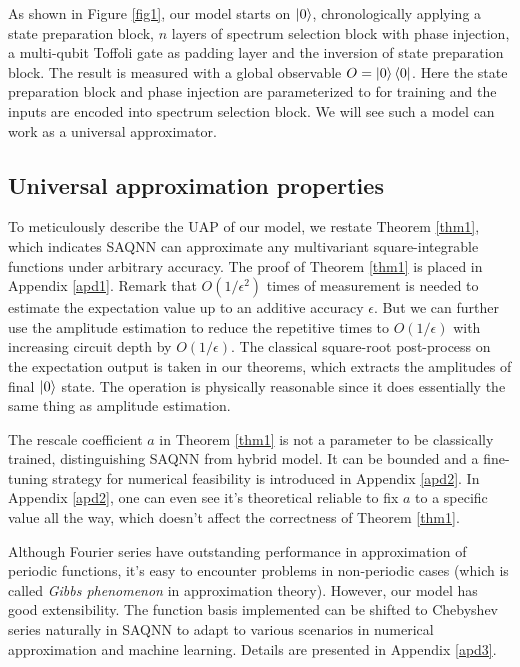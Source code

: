 \documentclass{article}
\theoremstyle{plain}
\theoremstyle{definition}
\theoremstyle{remark}
\begin{document}
As shown in Figure \ref{fig1}, our model starts on $\ket{0}$, chronologically applying a state preparation block, $n$ layers of spectrum selection block with phase injection, a multi-qubit Toffoli gate as padding layer and the inversion of state preparation block. The result is measured with a global observable $O=\ket{0}\bra{0}$. Here the state preparation block and phase injection are parameterized to for training and the inputs are encoded into spectrum selection block. We will see such a model can work as a universal approximator.

\subsection{Universal approximation properties}
To meticulously describe the UAP of our model, we restate Theorem \ref{thm1}, which indicates SAQNN can approximate any multivariant square-integrable functions under arbitrary accuracy.
\thmone*
The proof of Theorem \ref{thm1} is placed in Appendix \ref{apd1}. Remark that $O(1/\epsilon^2)$ times of measurement is needed to estimate the expectation value up to an additive accuracy $\epsilon$. But we can further use the amplitude estimation \cite{Brassard} to reduce the repetitive times to $O(1/\epsilon)$ with increasing circuit depth by $O(1/\epsilon)$. The classical square-root post-process on the expectation output is taken in our theorems, which extracts the amplitudes of final $\ket{0}$ state. The operation is physically reasonable since it does essentially the same thing as amplitude estimation.  

The rescale coefficient $a$ in Theorem \ref{thm1} is not a parameter to be classically trained, distinguishing SAQNN from hybrid model. It can be bounded and a fine-tuning strategy for numerical feasibility is introduced in Appendix \ref{apd2}. In Appendix \ref{apd2}, one can even see it's theoretical reliable to fix $a$ to a specific value all the way, which doesn't affect the correctness of Theorem \ref{thm1}. 

Although Fourier series have outstanding performance in approximation of periodic functions, it's easy to encounter problems in non-periodic cases (which is called \textit{Gibbs phenomenon} \cite{gottlieb1997} in approximation theory). However, our model has good extensibility. The function basis implemented can be shifted to Chebyshev series naturally in SAQNN to adapt to various scenarios in numerical approximation and machine learning. Details are presented in Appendix \ref{apd3}.
\end{document}
